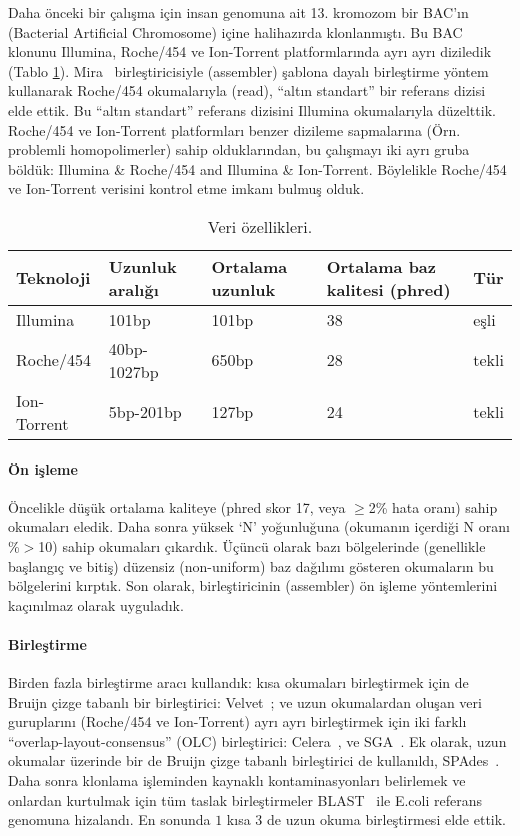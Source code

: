
Daha önceki bir çalışma için insan genomuna ait 13. kromozom bir BAC'ın (Bacterial Artificial Chromosome) içine halihazırda klonlanmıştı. 
Bu BAC klonunu Illumina, Roche/454 ve Ion-Torrent platformlarında ayrı ayrı diziledik (Tablo \ref{tab:dataprop}).
Mira~\cite{Chevreux1999} birleştiricisiyle (assembler) şablona dayalı birleştirme yöntem kullanarak Roche/454 okumalarıyla (read), ``altın standart'' bir referans dizisi elde ettik. Bu ``altın standart'' referans dizisini Illumina okumalarıyla düzelttik.
Roche/454 ve Ion-Torrent platformları benzer dizileme sapmalarına (Örn. problemli homopolimerler) sahip olduklarından, bu çalışmayı iki ayrı gruba böldük: Illumina \& Roche/454 and Illumina \& Ion-Torrent. Böylelikle Roche/454 ve Ion-Torrent verisini kontrol etme imkanı bulmuş olduk.

\begin{table}[htb]
\caption{Veri özellikleri.}     
\label{tab:dataprop}
\begin{tabular}{|l|l|l|l|l|}
\hline
Teknoloji & Uzunluk aralığı & Ortalama uzunluk & Ortalama baz kalitesi (phred) & Tür \\ 
\hline
Illumina & 101bp & 101bp & 38 & eşli \\
Roche/454 & 40bp-1027bp & 650bp & 28 & tekli \\
Ion-Torrent & 5bp-201bp & 127bp & 24 & tekli \\
\hline
\end{tabular}
\end{table}


\paragraph{Ön işleme} 
Öncelikle düşük ortalama kaliteye (phred skor 17, veya $\geq$2\% hata oranı) sahip okumaları eledik. Daha sonra yüksek `N' yoğunluğuna (okumanın içerdiği N oranı \%$>$10) sahip okumaları çıkardık. Üçüncü olarak bazı bölgelerinde (genellikle başlangıç ve bitiş) düzensiz (non-uniform) baz dağılımı gösteren okumaların bu bölgelerini kırptık. Son olarak, birleştiricinin (assembler) ön işleme yöntemlerini kaçınılmaz olarak uyguladık.

\paragraph{Birleştirme} Birden fazla birleştirme aracı kullandık: kısa okumaları birleştirmek için de Bruijn çizge tabanlı bir birleştirici: Velvet~\cite{Zerbino2008}; ve uzun okumalardan oluşan veri guruplarını (Roche/454 ve Ion-Torrent) ayrı ayrı birleştirmek için iki farklı ``overlap-layout-consensus'' (OLC) birleştirici: Celera~\cite{Myers2000}, ve SGA~\cite{Simpson2012}. Ek olarak, uzun okumalar üzerinde bir de Bruijn çizge tabanlı birleştirici de kullanıldı, SPAdes~\cite{Bankevich2012}. Daha sonra klonlama işleminden kaynaklı kontaminasyonları belirlemek ve onlardan kurtulmak için tüm taslak birleştirmeler BLAST~\cite{Altschul1990} ile E.coli referans genomuna hizalandı. En sonunda $1$ kısa $3$ de uzun okuma birleştirmesi elde ettik.
 

